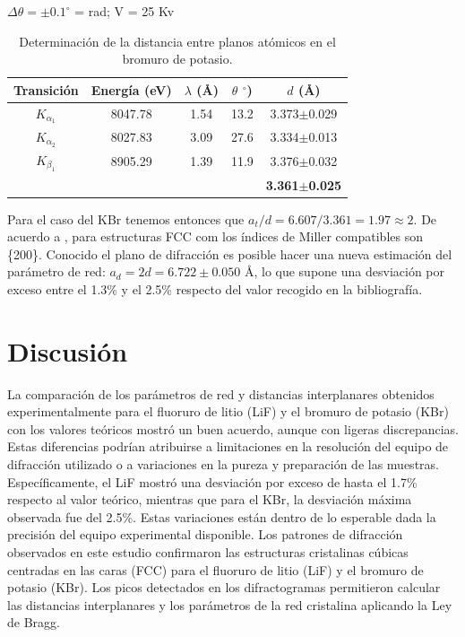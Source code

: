 \begin{table}[H]
	\centering
	$\Delta \theta = \pm0.1^\circ$ =  rad; V = 25 Kv\\
	\begin{tabular}{ccccc}
		\toprule
		\toprule
		Transición & Energía (eV) & $\lambda$ (\AA)  &$\theta$ $^\circ$) & $d$ (\AA) \\
		\hline 
		$K_{\alpha_1}$ & 8047.78 & 1.54 &13.2 & 3.373$\pm$0.029 \\
		$K_{\alpha_2}$ & 8027.83 & 3.09 &27.6 & 3.334$\pm$0.013 \\
		$K_{\beta_1}$  & 8905.29 & 1.39 &11.9 & 3.376$\pm$0.032 \\

		\hline
		\hline 
		& & & & \textbf{3.361$\pm$0.025} \\
	\end{tabular}
	\caption{\footnotesize Determinación de la distancia entre planos atómicos en el bromuro de potasio.}
	\label{tab:d_kbr}
\end{table}

\vspace{\baselineskip}

Para el caso del KBr tenemos entonces que $a_t/d = 6.607/3.361 = 1.97 \approx 2 $. De acuerdo a \cite{Cullity2014}, para estructuras FCC com los índices de Miller compatibles son \{200\}. Conocido el plano de difracción es posible hacer una nueva estimación del parámetro de red: $ a_d = 2d = 6.722\pm0.050$ \AA, lo que supone una desviación por exceso entre el 1.3\% y el 2.5\% respecto del valor recogido en la bibliografía.


\section{Discusión}


La comparación de los parámetros de red y distancias interplanares obtenidos experimentalmente para el fluoruro de litio (LiF) y el bromuro de potasio (KBr) con los valores teóricos mostró un buen acuerdo, aunque con ligeras discrepancias. Estas diferencias podrían atribuirse a limitaciones en la resolución del equipo de difracción utilizado o a variaciones en la pureza y preparación de las muestras. Específicamente, el LiF mostró una desviación por exceso de hasta el 1.7\% respecto al valor teórico, mientras que para el KBr, la desviación máxima observada fue del 2.5\%. Estas variaciones están dentro de lo esperable dada la precisión del equipo experimental disponible. Los patrones de difracción observados en este estudio confirmaron las estructuras cristalinas cúbicas centradas en las caras (FCC) para el fluoruro de litio (LiF) y el bromuro de potasio (KBr). Los picos detectados en los difractogramas permitieron calcular las distancias interplanares y los parámetros de la red cristalina aplicando la Ley de Bragg. 

